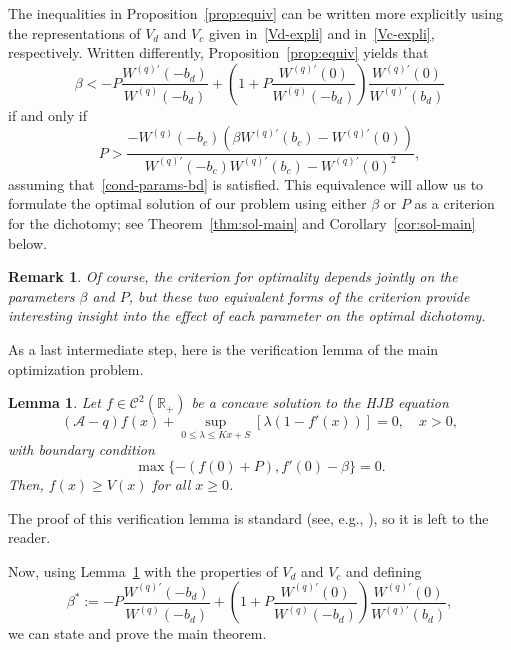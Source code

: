 \documentclass[11pt,reqno]{amsart}
\newtheorem{lemma}[theorem]{Lemma}
\newtheorem{remark}[theorem]{Remark}
\newcommand{\reals}{\mathbb{R}}
\newcommand{\Wq}{W^{(q)}}
\newcommand{\Wqprime}{W^{(q) \prime}}
\renewcommand{\geq}{\geqslant}
\renewcommand{\leq}{\leqslant}
\begin{document}
The inequalities in Proposition~\ref{prop:equiv} can be written more explicitly using the representations of $V_d$ and $V_c$ given in~\eqref{Vd-expli} and in~\eqref{Vc-expli}, respectively. Written differently, Proposition~\ref{prop:equiv} yields that
\begin{equation}
    \beta < -P\frac{\Wqprime (-b_d)}{\Wq(-b_d)} + \left(1+P\frac{\Wqprime (0)}{\Wq(-b_d)}\right)\frac{\Wqprime (0)}{\Wqprime (b_d)}
\end{equation}
if and only if
\begin{equation}
    P > \frac{-\Wq(-b_c)\left(\beta \Wqprime (b_c) - \Wqprime (0)\right)}{\Wqprime (-b_c) \Wqprime (b_c) - \Wqprime(0)^2} ,
\end{equation}
assuming that~\eqref{cond-params-bd} is satisfied. This equivalence will allow us to formulate the optimal solution of our problem using either $\beta$ or $P$ as a criterion for the dichotomy; see Theorem~\ref{thm:sol-main} and Corollary~\ref{cor:sol-main} below.

\begin{remark}
Of course, the criterion for optimality depends jointly on the parameters $\beta$ and $P$, but these two equivalent forms of the criterion provide interesting insight into the effect of each parameter on the optimal dichotomy.
\end{remark}

As a last intermediate step, here is the verification lemma of the main optimization problem.
\begin{lemma}\label{lem:verif}
    Let $f\in\mathcal{C}^2(\reals_+)$ be a concave solution to the HJB equation
    \begin{equation}\label{HJB}
        (\mathcal{A}-q)f(x) + \sup_{0\leq\lambda\leq Kx+S}\left[\lambda(1-f'(x))\right] = 0, \quad x > 0,
    \end{equation}
    with boundary condition
    \begin{equation}\label{bound-cond}
        \max\{-(f(0)+P), f'(0)-\beta\} = 0 .
    \end{equation}
Then, $f(x)\geq V(x)$ for all $x\geq 0$.
\end{lemma}
The proof of this verification lemma is standard (see, e.g., \cite{lokka-zervos_2008}), so it is left to the reader.

Now, using Lemma~\ref{lem:verif} with the properties of $V_d$ and $V_c$ and defining
\begin{equation}\label{beta-star}
    \beta^* := -P\frac{\Wqprime (-b_d)}{\Wq(-b_d)} + \left(1+P\frac{\Wqprime (0)}{\Wq(-b_d)}\right)\frac{\Wqprime (0)}{\Wqprime (b_d)},
\end{equation}
we can state and prove the main theorem.
\end{document}
